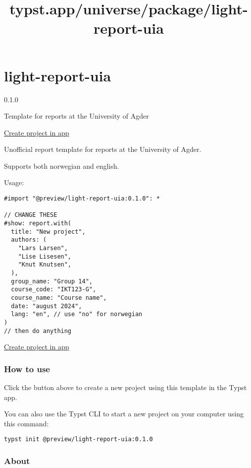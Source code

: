 \title{typst.app/universe/package/light-report-uia}

\label{banner}
\label{template-thumbnail}

\section{light-report-uia}\label{light-report-uia}

{ 0.1.0 }

Template for reports at the University of Agder

\href{/app?template=light-report-uia&version=0.1.0}{Create project in
app}

\label{readme}
Unofficial report template for reports at the University of Agder.

Supports both norwegian and english.

Usage:

\begin{verbatim}
#import "@preview/light-report-uia:0.1.0": *

// CHANGE THESE
#show: report.with(
  title: "New project",
  authors: (
    "Lars Larsen",
    "Lise Lisesen",
    "Knut Knutsen",
  ),
  group_name: "Group 14",
  course_code: "IKT123-G",
  course_name: "Course name",
  date: "august 2024",
  lang: "en", // use "no" for norwegian
)
// then do anything
\end{verbatim}

\href{/app?template=light-report-uia&version=0.1.0}{Create project in
app}

\subsubsection{How to use}\label{how-to-use}

Click the button above to create a new project using this template in
the Typst app.

You can also use the Typst CLI to start a new project on your computer
using this command:

\begin{verbatim}
typst init @preview/light-report-uia:0.1.0
\end{verbatim}



\subsubsection{About}\label{about}

